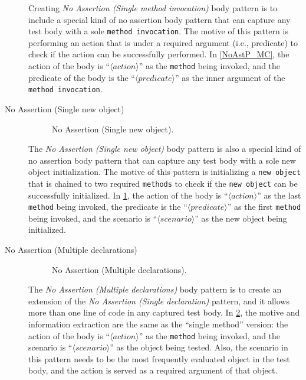 \begin{description}
Creating \textit{No Assertion (Single method invocation)} body pattern is to include a special kind of no assertion body pattern that can capture any test body with a sole \texttt{method invocation}.
%
The motive of this pattern is performing an action that is under a required argument (i.e., predicate) to check if the action can be successfully performed.
%
In \cref{NoAstP_MC}, the action of the body is \enquote{$\langle action \rangle$} as the \texttt{method} being invoked, and the predicate of the body is the \enquote{$\langle predicate \rangle$} as the inner argument of the \texttt{method invocation}.


\item[No Assertion (Single new object)]

\begin{figure}[htbp]
\centering
    \begin{subfigure}{0.75\textwidth}
    \end{subfigure}
\caption{No Assertion (Single new object).}
\label{NoAstP_new}
\end{figure}


The \textit{No Assertion (Single new object)} body pattern is also a special kind of no assertion body pattern that can capture any test body with a sole new object initialization.
%
The motive of this pattern is initializing a \texttt{new object} that is chained to two required \texttt{methods} to check if the \texttt{new object} can be successfully initialized.
%
In \cref{NoAstP_new}, the action of the body is \enquote{$\langle action \rangle$} as the last \texttt{method} being invoked, the predicate is the \enquote{$\langle predicate \rangle$} as the first \texttt{method} being invoked, and the scenario is \enquote{$\langle scenario \rangle$} as the new object being initialized.


\item[No Assertion (Multiple declarations)]

\begin{figure}[htbp]
\centering
    \begin{subfigure}{0.7\textwidth}
    \end{subfigure}
\caption{No Assertion (Multiple declarations).}
\label{NoAstP_m_dec}
\end{figure}

The \textit{No Assertion (Multiple declarations)} body pattern is to create an extension of the \textit{No Assertion (Single declaration)} pattern, and it allows more than one line of code in any captured test body.
%
In \cref{NoAstP_m_dec}, the motive and information extraction are the same as the \enquote{single method} version: the action of the body is \enquote{$\langle action \rangle$} as the \texttt{method} being invoked, and the scenario is \enquote{$\langle scenario \rangle$} as the object being tested.
%
Also, the scenario in this pattern needs to be the most frequently evaluated object in the test body, and the action is served as a required argument of that object.



\end{description}
